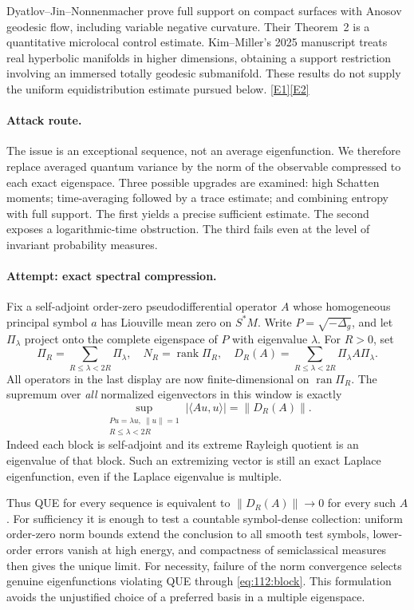 \documentclass[11pt,a4paper]{article}
\newcommand{\eref}[2]{\hyperlink{extra:#1:#2}{[E#2]}}
\numberwithin{equation}{section}
\begin{document}
Dyatlov--Jin--Nonnenmacher prove full support on compact surfaces with
Anosov geodesic flow, including variable negative curvature. Their
Theorem~2 is a quantitative microlocal control estimate. Kim--Miller's
2025 manuscript treats real hyperbolic manifolds in higher dimensions,
obtaining a support restriction involving an immersed totally geodesic
submanifold. These results do not supply the uniform equidistribution
estimate pursued below. \eref{112}{1}\eref{112}{2}

\paragraph{Attack route.}
The issue is an exceptional sequence, not an average eigenfunction. We
therefore replace averaged quantum variance by the norm of the observable
compressed to each exact eigenspace. Three possible upgrades are examined:
high Schatten moments; time-averaging followed by a trace estimate; and
combining entropy with full support. The first yields a precise sufficient
estimate. The second exposes a logarithmic-time obstruction. The third
fails even at the level of invariant probability measures.

\paragraph{Attempt: exact spectral compression.}
Fix a self-adjoint order-zero pseudodifferential operator $A$ whose
homogeneous principal symbol $a$ has Liouville mean zero on $S^*M$.
Write $P=\sqrt{-\Delta_g}$, and let $\Pi_\lambda$ project onto the complete
eigenspace of $P$ with eigenvalue $\lambda$. For $R>0$, set
\[
 \Pi_R=\sum_{R\leq\lambda<2R}\Pi_\lambda,\quad
 N_R=\operatorname{rank}\Pi_R,\quad
 D_R(A)=\sum_{R\leq\lambda<2R}\Pi_\lambda A\Pi_\lambda.
\]
All operators in the last display are now finite-dimensional on
$\operatorname{ran}\Pi_R$. The supremum over \emph{all} normalized eigenvectors
in this window is exactly
\begin{equation}\label{eq:112:block}
 \sup_{\substack{Pu=\lambda u,\ \|u\|=1\\ R\leq\lambda<2R}}
 |\langle Au,u\rangle|=\|D_R(A)\|.
\end{equation}
Indeed each block is self-adjoint and its extreme Rayleigh quotient is an
eigenvalue of that block. Such an extremizing vector is still an exact
Laplace eigenfunction, even if the Laplace eigenvalue is multiple.

Thus QUE for every sequence is equivalent to $\|D_R(A)\|\to0$ for every
such $A$. For sufficiency it is enough to test a countable symbol-dense
collection: uniform order-zero norm bounds extend the conclusion to all
smooth test symbols, lower-order errors vanish at high energy, and
compactness of semiclassical measures then gives the unique limit.
For necessity, failure of the norm convergence selects genuine
eigenfunctions violating QUE through \eqref{eq:112:block}. This formulation
avoids the unjustified choice of a preferred basis in a multiple eigenspace.
\end{document}
